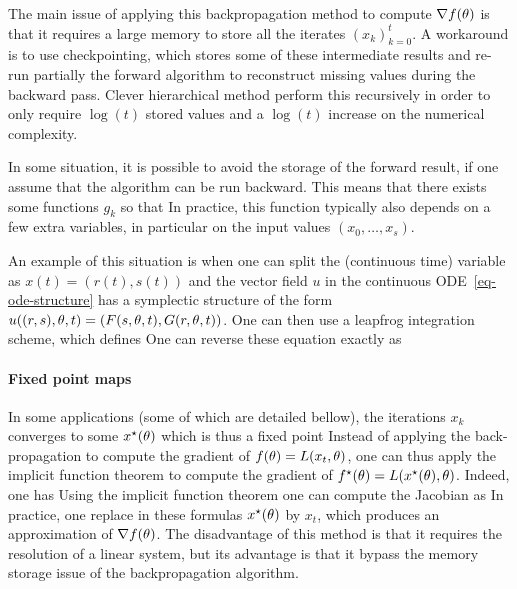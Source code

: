 The main issue of applying this backpropagation method to compute $\nabla f(\theta)$ is that it requires a large memory to store all the iterates $(x_k)_{k=0}^t$. A workaround is to use checkpointing, which stores some of these intermediate results and re-run partially the forward algorithm to reconstruct missing values during the backward pass. Clever hierarchical method perform this recursively in order to only require $\log(t)$ stored values and a $\log(t)$ increase on the numerical complexity. 

In some situation, it is possible to avoid the storage of the forward result, if one assume that the algorithm can be run backward. This means that there exists some functions $g_k$ so that 
In practice, this function typically also depends on a few extra variables, in particular on the input values $(x_0,\ldots,x_s)$.

An example of this situation is when one can split the (continuous time) variable as $x(t)=(r(t),s(t))$ and the vector field $u$ in the continuous ODE~\eqref{eq-ode-structure} has a symplectic structure of the form $u((r,s),\theta,t) = ( F(s,\theta,t),G(r,\theta,t) )$. One can then use a leapfrog integration scheme, which defines  
One can reverse these equation exactly as

\paragraph{Fixed point maps}

In some applications (some of which are detailed bellow), the iterations $x_k$ converges to some $x^\star(\theta)$ which is thus a fixed point 
Instead of applying the back-propagation to compute the gradient of $f(\theta) = L(x_t,\theta)$, one can thus apply the implicit function theorem to compute the gradient of $f^\star(\theta) = L(x^\star(\theta),\theta)$. Indeed, one has
Using the implicit function theorem one can compute the Jacobian as
In practice, one replace in these formulas $x^\star(\theta)$ by $x_t$, which produces an approximation of $\nabla f(\theta)$. 
%
The disadvantage of this method is that it requires the resolution of a linear system, but its advantage is that it bypass the memory storage issue of the backpropagation algorithm.



